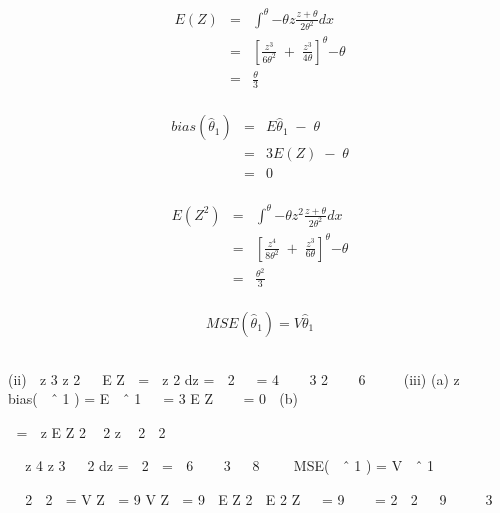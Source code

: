 \documentclass[a4paper,12pt]{article}
\begin{document}
\begin{eqnarray*}
E(Z)
&=& \int^{\theta}{-\theta} z \frac{z +  \theta}{2\theta^2} dx \\
&=& \left[ \frac{z^3}{6 \theta^2}  \;+\; \frac{z^3}{4\theta} \right]^{\theta}{-\theta} \\
&=& \frac{\theta}{3}\\
\end{eqnarray*}


\begin{eqnarray*}
bias( \hat{\theta}_{1} )  &=&  E \hat{\theta}_{1} \;-\; \theta  \\ 
&=&  3 E ( Z ) \;-\; \theta   \\ 
&=&  0\\
\end{eqnarray*}


\begin{eqnarray*}
E(Z^2)
&=& \int^{\theta}{-\theta} z^2 \frac{z +  \theta}{2\theta^2} dx \\
&=& \left[ \frac{z^4}{8 \theta^2}  \;+\; \frac{z^3}{6\theta} \right]^{\theta}{-\theta} \\
&=& \frac{\theta^2}{3}\\
\end{eqnarray*}


\[MSE( \hat{\theta}_{1} )  =  V \hat{\theta}_{1}\]
\newpage

\begin{table}[ht!]
 \centering
 \begin{tabular}{|p{15cm}|}
 \hline  
 
 \\ \hline
  \end{tabular}
\end{table}



(ii)  z 3 z 2 

E \lambda Z  =  z 2 dz =  2   =
4   
3
2 
  6 


(iii) (a)
z 
\lambda 
bias(  ˆ 1 ) = E  ˆ 1   = 3 E \lambda Z    = 0

(b)

\lambda  =  z
E Z
2

2
z 
2  2


 z 4 z 3 
 2
dz =  2 
=

6   
3
  8 

\lambda 
MSE(  ˆ 1 ) = V  ˆ 1


  2  2 
= V  Z  = 9 V \lambda Z  = 9  E Z 2  E 2 \lambda Z   = 9    = 2  2


9  
  3
\end{document}
